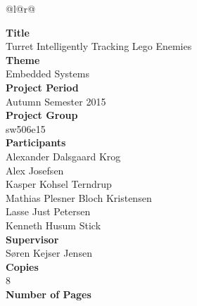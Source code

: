 
\begin{nopagebreak}
{\begin{center}
    \begin{tabular*}{\textwidth}{@{}l@{\extracolsep{\fill}}r@{}}
        \\
        \begin{minipage}[t]{0.49\textwidth}
            \textbf{Title}\\
            Turret Intelligently Tracking Lego Enemies\\

            \textbf{Theme}\\
            Embedded Systems\\

            \textbf{Project Period}\\
            Autumn Semester 2015\\

            \textbf{Project Group}\\
            sw506e15\\

            \textbf{Participants}\\
            Alexander Dalsgaard Krog\\
            Alex Josefsen\\
            Kasper Kohsel Terndrup\\
            Mathias Plesner Bloch Kristensen\\
            Lasse Just Petersen\\
            Kenneth Husum Stick\\

            \textbf{Supervisor}\\
            Søren Kejser Jensen\\

            \textbf{Copies}\\
            8\\ %

            \textbf{Number of Pages}\\
            \pageref{LastPage}\\
            

\end{minipage}
\end{tabular*}
\end{center}}
\end{nopagebreak}

